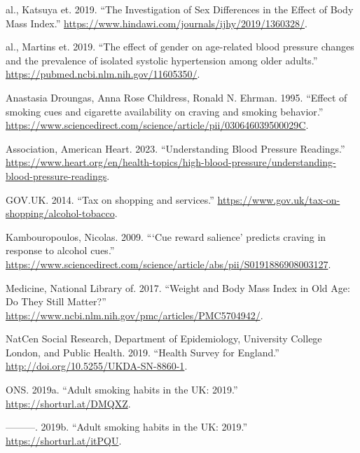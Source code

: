 \documentclass[
  11pt,
  twocolumn]{article}
\newlength{\cslhangindent}
\newlength{\cslentryspacingunit} %
\newenvironment{CSLReferences}[2] %
 {%
  \setlength{\parindent}{0pt}
  \ifodd #1
  \let\oldpar\par
  \def\par{\hangindent=\cslhangindent\oldpar}
  \fi
  \setlength{\parskip}{#2\cslentryspacingunit}
 }%
 {}
\begin{document}
\hypertarget{refs}{}
\begin{CSLReferences}{1}{0}
\leavevmode{}%
al., Katsuya et. 2019. {``{The Investigation of Sex Differences in the
Effect of Body Mass Index}.''}
\url{https://www.hindawi.com/journals/ijhy/2019/1360328/}.

\leavevmode{}%
al., Martins et. 2019. {``{The effect of gender on age-related blood
pressure changes and the prevalence of isolated systolic hypertension
among older adults}.''} \url{https://pubmed.ncbi.nlm.nih.gov/11605350/}.

\leavevmode{}%
Anastasia Droungas, Anna Rose Childress, Ronald N. Ehrman. 1995.
{``{Effect of smoking cues and cigarette availability on craving and
smoking behavior}.''}
\url{https://www.sciencedirect.com/science/article/pii/030646039500029C}.

\leavevmode{}%
Association, American Heart. 2023. {``{Understanding Blood Pressure
Readings}.''}
\url{https://www.heart.org/en/health-topics/high-blood-pressure/understanding-blood-pressure-readings}.

\leavevmode{}%
GOV.UK. 2014. {``{Tax on shopping and services}.''}
\url{https://www.gov.uk/tax-on-shopping/alcohol-tobacco}.

\leavevmode{}%
Kambouropoulos, Nicolas. 2009. {``{{`Cue reward salience'} predicts
craving in response to alcohol cues}.''}
\url{https://www.sciencedirect.com/science/article/abs/pii/S0191886908003127}.

\leavevmode{}%
Medicine, National Library of. 2017. {``{Weight and Body Mass Index in
Old Age: Do They Still Matter?}''}
\url{https://www.ncbi.nlm.nih.gov/pmc/articles/PMC5704942/}.

\leavevmode{}%
NatCen Social Research, Department of Epidemiology, University College
London, and Public Health. 2019. {``{Health Survey for England}.''}
\url{http://doi.org/10.5255/UKDA-SN-8860-1}.

\leavevmode{}%
ONS. 2019a. {``{Adult smoking habits in the UK: 2019}.''}
\url{https://shorturl.at/DMQXZ}.

\leavevmode{}%
---------. 2019b. {``{Adult smoking habits in the UK: 2019}.''}
\url{https://shorturl.at/itPQU}.


\end{CSLReferences}
\end{document}
